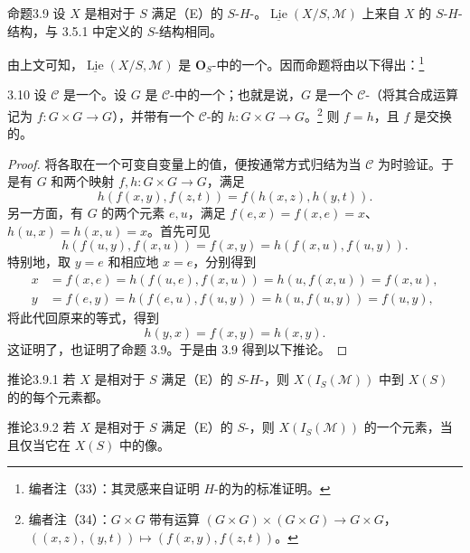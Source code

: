 \begin{SGAresult}{命题}{3.9}
设 $X$ 是相对于 $S$ 满足（E）的 $S$-$H$-。$\underline{\operatorname{Lie}}(X/S,\mathcal M)$ 上来自 $X$ 的 $S$-$H$-结构，与 3.5.1 中定义的 $S$-结构相同。
\end{SGAresult}
由上文可知，$\underline{\operatorname{Lie}}(X/S,\mathcal M)$ 是 $\mathbf O_S$-中的一个。因而命题将由以下得出：\footnote{编者注（33）：其灵感来自证明 $H$-的为的标准证明。}
\begin{SGAresult}{}{3.10}
设 $\mathscr C$ 是一个。设 $G$ 是 $\mathscr C$-中的一个；也就是说，$G$ 是一个 $\mathscr C$-（将其合成运算记为 $f:G\times G\to G$），并带有一个 $\mathscr C$-的 $h:G\times G\to G$。\footnote{编者注（34）：$G\times G$ 带有运算 $(G\times G)\times(G\times G)\to G\times G$，$((x,z),(y,t))\mapsto(f(x,y),f(z,t))$。} 则 $f=h$，且 $f$ 是交换的。
\end{SGAresult}
\begin{proof}
将各取在一个可变自变量上的值，便按通常方式归结为当 $\mathscr C$ 为时验证。于是有 $G$ 和两个映射 $f,h:G\times G\to G$，满足
\[
h(f(x,y),f(z,t))=f(h(x,z),h(y,t)).
\]
另一方面，有 $G$ 的两个元素 $e,u$，满足 $f(e,x)=f(x,e)=x$、$h(u,x)=h(x,u)=x$。首先可见
\[
h(f(u,y),f(x,u))=f(x,y)=h(f(x,u),f(u,y)).
\]
特别地，取 $y=e$ 和相应地 $x=e$，分别得到
\[
\begin{aligned}
x&=f(x,e)=h(f(u,e),f(x,u))=h(u,f(x,u))=f(x,u),\\
y&=f(e,y)=h(f(e,u),f(u,y))=h(u,f(u,y))=f(u,y),
\end{aligned}
\]
将此代回原来的等式，得到
\[
h(y,x)=f(x,y)=h(x,y).
\]
这证明了，也证明了命题 3.9。于是由 3.9 得到以下推论。
\end{proof}
\begin{SGAresult}{推论}{3.9.1}
若 $X$ 是相对于 $S$ 满足（E）的 $S$-$H$-，则 $X(I_S(\mathcal M))$ 中到 $X(S)$ 的的每个元素都。
\end{SGAresult}
\begin{SGAresult}{推论}{3.9.2}
若 $X$ 是相对于 $S$ 满足（E）的 $S$-，则 $X(I_S(\mathcal M))$ 的一个元素，当且仅当它在 $X(S)$ 中的像。
\end{SGAresult}
